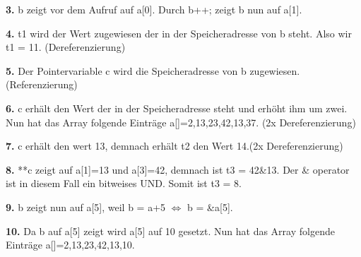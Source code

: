 \documentclass[a4paper,graphics,11pt]{article}
\begin{document}
\textbf{3.} b zeigt vor dem Aufruf auf a[0]. Durch b++; zeigt b nun auf a[1].

\textbf{4.} t1 wird der Wert zugewiesen der in der Speicheradresse von b steht. Also wir t1 = 11. (Dereferenzierung)

\textbf{5.} Der Pointervariable c wird die Speicheradresse von b zugewiesen. (Referenzierung)

\textbf{6.} c erhält den Wert der in der Speicheradresse steht und erhöht ihm um zwei. Nun hat das Array folgende Einträge a[]={2,13,23,42,13,37}. (2x Dereferenzierung)

\textbf{7.} c erhält den wert 13, demnach erhält t2 den Wert 14.(2x Dereferenzierung)

\textbf{8.} **c zeigt auf a[1]=13 und a[3]=42, demnach ist t3 = 42\&13. Der \& operator ist in diesem Fall ein bitweises UND. Somit ist t3 = 8.

\textbf{9.} b zeigt nun auf a[5], weil b = a+5 $\Longleftrightarrow$ b = \&a[5].

\textbf{10.} Da b auf a[5] zeigt wird a[5] auf 10 gesetzt. Nun hat das Array folgende Einträge a[]={2,13,23,42,13,10}.
\end{document}
